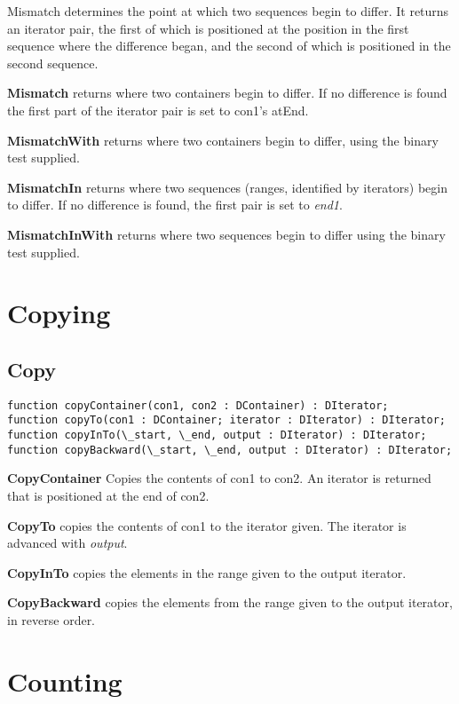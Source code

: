 \documentclass{report}
\begin{document}
Mismatch determines the point at which two sequences begin to differ. It
returns an iterator pair, the first of which is positioned at the position
in the first sequence where the difference began, and the second of which is
positioned in the second sequence.

\textbf{Mismatch} returns where two containers begin to differ. If no
difference is found the first part of the iterator pair is set to con1's
atEnd.

\textbf{MismatchWith} returns where two containers begin to differ, using the 
binary test supplied.

\textbf{MismatchIn} returns where two sequences (ranges, identified by iterators) 
begin to differ. If no difference is found, the first pair is set to \emph{end1}.

\textbf{MismatchInWith } returns where two sequences begin to differ using the 
binary test supplied.

\section{Copying}

\subsection{Copy}

\begin{lstlisting}
function copyContainer(con1, con2 : DContainer) : DIterator;
function copyTo(con1 : DContainer; iterator : DIterator) : DIterator;
function copyInTo(\_start, \_end, output : DIterator) : DIterator;
function copyBackward(\_start, \_end, output : DIterator) : DIterator;
\end{lstlisting}

\textbf{CopyContainer}  Copies the contents of con1 to con2. An iterator is returned 
that is positioned at the end of con2.

\textbf{ CopyTo} copies the contents of con1 to the iterator given. The 
iterator is advanced with \emph{output}.

\textbf{CopyInTo} copies the elements in the range given to the output 
iterator.

\textbf{CopyBackward} copies the elements from the range given to the output
iterator, in reverse order.

\section{Counting}
\end{document}
